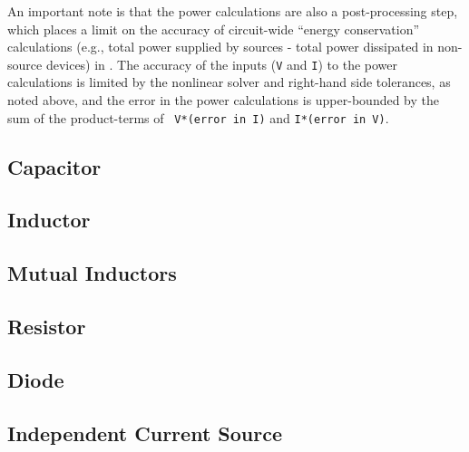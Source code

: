 An important note is that the power calculations are also a
post-processing step, which places a limit on the accuracy of
circuit-wide ``energy conservation'' calculations (e.g., total power
supplied by sources - total power dissipated in non-source devices) in
\Xyce{}.  The accuracy of the inputs ({\tt V} and {\tt I}) to the
power calculations is limited by the nonlinear solver and right-hand
side tolerances, as noted above, and the error in the power
calculations is upper-bounded by the sum of the product-terms of {\tt
  V*(error in I)} and {\tt I*(error in V)}.


\clearpage
\subsection{Capacitor}
 


\clearpage
\subsection{Inductor}
 


\clearpage
\subsection{Mutual Inductors}
\label{MutualInductor}
 


\clearpage
\subsection{Resistor}
 


\clearpage
\subsection{Diode}
 


\clearpage
\subsection{Independent Current Source}
 
\label{IndependentCurrentSource}


